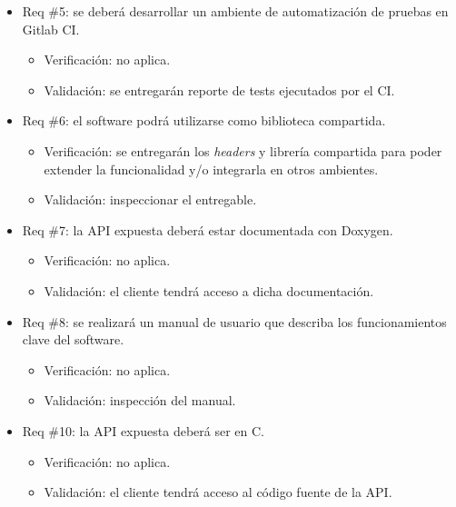 \begin{itemize}
\item Req \#5: se deberá desarrollar un ambiente de automatización de pruebas en Gitlab CI.

  \begin{itemize}
  \item Verificación: no aplica.
  \item Validación: se entregarán reporte de tests ejecutados por el CI.
  \end{itemize}

\item Req \#6: el software podrá utilizarse como biblioteca compartida.

  \begin{itemize}
  \item Verificación: se entregarán los \textit{headers} y librería compartida para poder extender la funcionalidad y/o integrarla en otros ambientes.
  \item Validación: inspeccionar el entregable.
  \end{itemize}

\item Req \#7: la API expuesta deberá estar documentada con Doxygen.

  \begin{itemize}
  \item Verificación: no aplica.
  \item Validación: el cliente tendrá acceso a dicha documentación.
  \end{itemize}

\item Req \#8: se realizará un manual de usuario que describa los funcionamientos clave del software.

  \begin{itemize}
  \item Verificación: no aplica.
  \item Validación: inspección del manual.
  \end{itemize}

\item Req \#10: la API expuesta deberá ser en C.

  \begin{itemize}
  \item Verificación: no aplica.
  \item Validación: el cliente tendrá acceso al código fuente de la API.
  \end{itemize}

\end{itemize}

